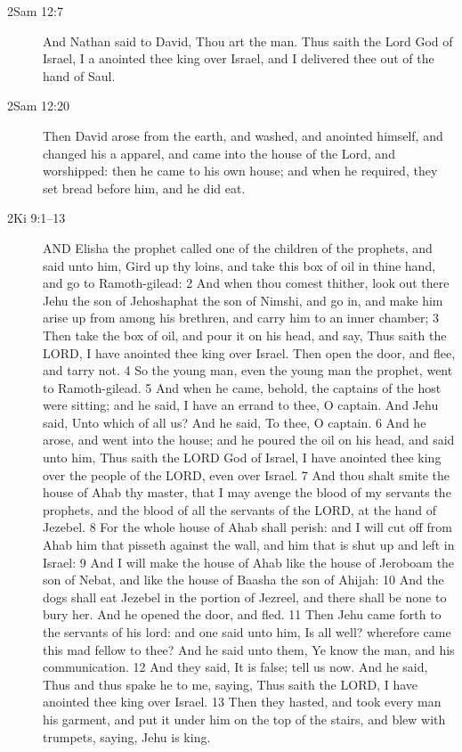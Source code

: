 \begin{description}
		\item[2Sam 12:7] And Nathan said to David, Thou art the man. Thus saith the Lord God of Israel, I a anointed thee king over Israel, and I delivered thee out of the hand of Saul.
		\item[2Sam 12:20] Then David arose from the earth, and washed, and anointed himself, and changed his a apparel, and came into the house of the Lord, and worshipped: then he came to his own house; and when he required, they set bread before him, and he did eat.
		\item[2Ki 9:1--13] AND Elisha the prophet called one of the children of the prophets, and said unto him, Gird up thy loins, and take this box of oil in thine hand, and go to Ramoth-gilead: 2 And when thou comest thither, look out there Jehu the son of Jehoshaphat the son of Nimshi, and go in, and make him arise up from among his brethren, and carry him to an inner chamber; 3 Then take the box of oil, and pour it on his head, and say, Thus saith the LORD, I have anointed thee king over Israel. Then open the door, and flee, and tarry not. 4 So the young man, even the young man the prophet, went to Ramoth-gilead. 5 And when he came, behold, the captains of the host were sitting; and he said, I have an errand to thee, O captain. And Jehu said, Unto which of all us? And he said, To thee, O captain. 6 And he arose, and went into the house; and he poured the oil on his head, and said unto him, Thus saith the LORD God of Israel, I have anointed thee king over the people of the LORD, even over Israel. 7 And thou shalt smite the house of Ahab thy master, that I may avenge the blood of my servants the prophets, and the blood of all the servants of the LORD, at the hand of Jezebel. 8 For the whole house of Ahab shall perish: and I will cut off from Ahab him that pisseth against the wall, and him that is shut up and left in Israel: 9 And I will make the house of Ahab like the house of Jeroboam the son of Nebat, and like the house of Baasha the son of Ahijah: 10 And the dogs shall eat Jezebel in the portion of Jezreel, and there shall be none to bury her. And he opened the door, and fled. 11 Then Jehu came forth to the servants of his lord: and one said unto him, Is all well? wherefore came this mad fellow to thee? And he said unto them, Ye know the man, and his communication. 12 And they said, It is false; tell us now. And he said, Thus and thus spake he to me, saying, Thus saith the LORD, I have anointed thee king over Israel. 13 Then they hasted, and took every man his garment, and put it under him on the top of the stairs, and blew with trumpets, saying, Jehu is king.

\end{description}
